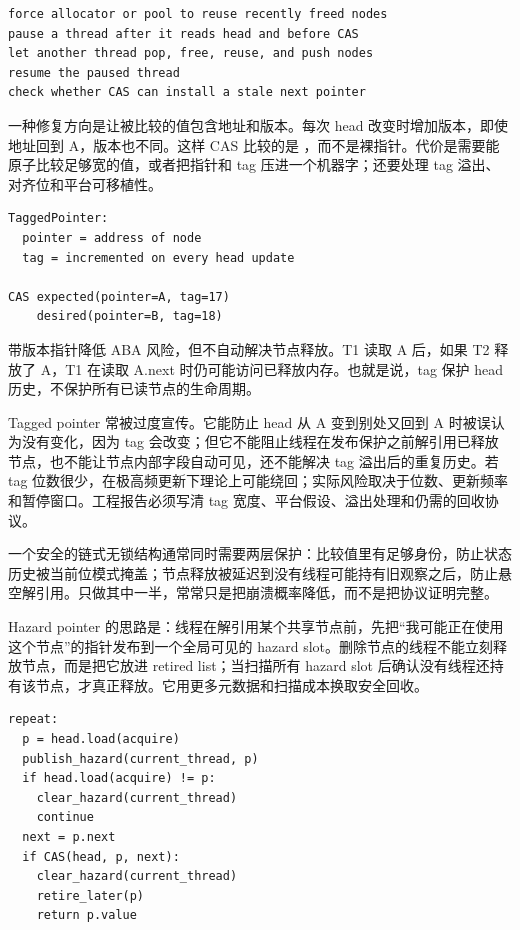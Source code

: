 \begin{lstlisting}[numbers=none,caption={ABA 测试需要放大的条件}]
force allocator or pool to reuse recently freed nodes
pause a thread after it reads head and before CAS
let another thread pop, free, reuse, and push nodes
resume the paused thread
check whether CAS can install a stale next pointer
\end{lstlisting}

一种修复方向是让被比较的值包含地址和版本。每次 head 改变时增加版本，即使地址回到 A，版本也不同。这样 CAS 比较的是 ，而不是裸指针。代价是需要能原子比较足够宽的值，或者把指针和 tag 压进一个机器字；还要处理 tag 溢出、对齐位和平台可移植性。

\begin{lstlisting}[numbers=none,caption={带版本 head 的抽象形态}]
TaggedPointer:
  pointer = address of node
  tag = incremented on every head update

CAS expected(pointer=A, tag=17)
    desired(pointer=B, tag=18)
\end{lstlisting}

带版本指针降低 ABA 风险，但不自动解决节点释放。T1 读取 A 后，如果 T2 释放了 A，T1 在读取 A.next 时仍可能访问已释放内存。也就是说，tag 保护 head 历史，不保护所有已读节点的生命周期。

Tagged pointer 常被过度宣传。它能防止 head 从 A 变到别处又回到 A 时被误认为没有变化，因为 tag 会改变；但它不能阻止线程在发布保护之前解引用已释放节点，也不能让节点内部字段自动可见，还不能解决 tag 溢出后的重复历史。若 tag 位数很少，在极高频更新下理论上可能绕回；实际风险取决于位数、更新频率和暂停窗口。工程报告必须写清 tag 宽度、平台假设、溢出处理和仍需的回收协议。

一个安全的链式无锁结构通常同时需要两层保护：比较值里有足够身份，防止状态历史被当前位模式掩盖；节点释放被延迟到没有线程可能持有旧观察之后，防止悬空解引用。只做其中一半，常常只是把崩溃概率降低，而不是把协议证明完整。

Hazard pointer 的思路是：线程在解引用某个共享节点前，先把“我可能正在使用这个节点”的指针发布到一个全局可见的 hazard slot。删除节点的线程不能立刻释放节点，而是把它放进 retired list；当扫描所有 hazard slot 后确认没有线程还持有该节点，才真正释放。它用更多元数据和扫描成本换取安全回收。

\begin{lstlisting}[numbers=none,caption={Hazard pointer pop 的抽象流程}]
repeat:
  p = head.load(acquire)
  publish_hazard(current_thread, p)
  if head.load(acquire) != p:
    clear_hazard(current_thread)
    continue
  next = p.next
  if CAS(head, p, next):
    clear_hazard(current_thread)
    retire_later(p)
    return p.value
\end{lstlisting}


